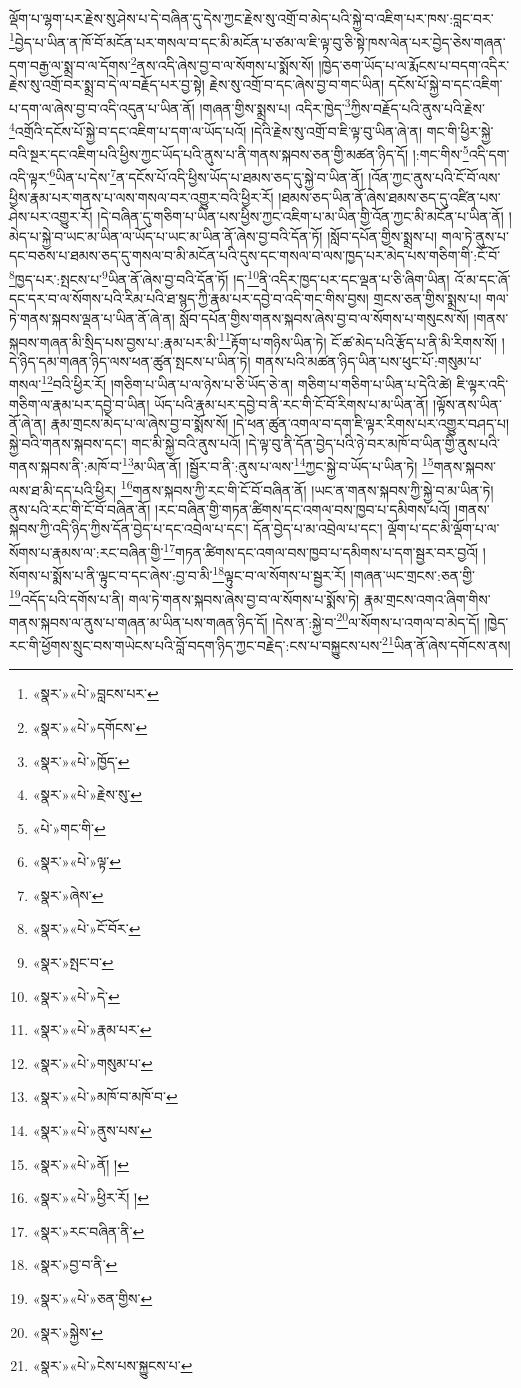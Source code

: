 ལྡོག་པ་ལྷག་པར་རྗེས་སུ་ཤེས་པ་དེ་བཞིན་དུ་དེས་ཀྱང་རྗེས་སུ་འགྲོ་བ་མེད་པའི་སྐྱེ་བ་འཇིག་པར་ཁས་:བླང་བར་\footnote{«སྣར་»«པེ་»བླངས་པར་}བྱེད་པ་ཡིན་ན་ཁོ་བོ་མངོན་པར་གསལ་བ་དང་མི་མངོན་པ་ཙམ་ལ་ཇི་ལྟ་བུ་ཅི་སྟེ་ཁས་ལེན་པར་བྱེད་ཅེས་གཞན་དག་བརྒྱ་ལ་སྨྲ་བ་ལ་དོགས་\footnote{«སྣར་»«པེ་»དགོངས་}ནས་འདི་ཞེས་བྱ་བ་ལ་སོགས་པ་སྨོས་སོ། །ཁྱེད་ཅག་ཡོད་པ་ལ་རྨོངས་པ་བདག་འདིར་རྗེས་སུ་འགྲོ་བར་སྨྲ་བ་དེ་ལ་བརྗོད་པར་བྱ་སྟེ། རྗེས་སུ་འགྲོ་བ་དང་ཞེས་བྱ་བ་གང་ཡིན། དངོས་པོ་སྐྱེ་བ་དང་འཇིག་པ་དག་ལ་ཞེས་བྱ་བ་འདི་འདུན་པ་ཡིན་ནོ། །གཞན་གྱིས་སྨྲས་པ། འདིར་ཁྱེད་\footnote{«སྣར་»«པེ་»ཁྱོད་}ཀྱིས་བརྗོད་པའི་ནུས་པའི་རྗེས་\footnote{«སྣར་»«པེ་»རྗེས་སུ་}འགྲོའི་དངོས་པོ་སྐྱེ་བ་དང་འཇིག་པ་དག་ལ་ཡོད་པའོ། །དེའི་རྗེས་སུ་འགྲོ་བ་ཇི་ལྟ་བུ་ཡིན་ཞེ་ན། གང་གི་ཕྱིར་སྐྱེ་བའི་སྔར་དང་འཇིག་པའི་ཕྱིས་ཀྱང་ཡོད་པའི་ནུས་པ་ནི་གནས་སྐབས་ཅན་གྱི་མཚན་ཉིད་དོ། །:གང་གིས་\footnote{«པེ་»གང་གི་}འདི་དག་འདི་ལྟར་\footnote{«སྣར་»«པེ་»ལྟ་}ཡིན་པ་དེས་\footnote{«སྣར་»ཞེས་}ན་དངོས་པོ་འདི་ཕྱིས་ཡོད་པ་ཐམས་ཅད་དུ་སྐྱེ་བ་ཡིན་ནོ། །འོན་ཀྱང་ནུས་པའི་ངོ་བོ་ལས་ཕྱིས་རྣམ་པར་གནས་པ་ལས་གསལ་བར་འགྱུར་བའི་ཕྱིར་རོ། །ཐམས་ཅད་ཡིན་ནོ་ཞེས་ཐམས་ཅད་དུ་འཛིན་པས་ཤེས་པར་འགྱུར་རོ། །དེ་བཞིན་དུ་གཅིག་པ་ཡིན་པས་ཕྱིས་ཀྱང་འཇིག་པ་མ་ཡིན་གྱི་འོན་ཀྱང་མི་མངོན་པ་ཡིན་ནོ། །མེད་པ་སྐྱེ་བ་ཡང་མ་ཡིན་ལ་ཡོད་པ་ཡང་མ་ཡིན་ནོ་ཞེས་བྱ་བའི་དོན་ཏོ། །སློབ་དཔོན་གྱིས་སྨྲས་པ། གལ་ཏེ་ནུས་པ་དང་བཅས་པ་ཐམས་ཅད་དུ་གསལ་བ་མི་མངོན་པའི་དུས་དང་གསལ་བ་ལས་ཁྱད་པར་མེད་པས་གཅིག་གི་:ངོ་བོ་\footnote{«སྣར་»«པེ་»ངོ་བོར་}ཁྱད་པར་:སྤངས་པ་\footnote{«སྣར་»སྤང་བ་}ཡིན་ནོ་ཞེས་བྱ་བའི་དོན་ཏོ། །ད་\footnote{«སྣར་»«པེ་»དེ་}ནི་འདིར་ཁྱད་པར་དང་ལྡན་པ་ཅི་ཞིག་ཡིན། འོ་མ་དང་ཞོ་དང་དར་བ་ལ་སོགས་པའི་རིམ་པའི་ཐ་སྙད་ཀྱི་རྣམ་པར་དབྱེ་བ་འདི་གང་གིས་བྱས། གྲངས་ཅན་གྱིས་སྨྲས་པ། གལ་ཏེ་གནས་སྐབས་ལྡན་པ་ཡིན་ནོ་ཞེ་ན། སློབ་དཔོན་གྱིས་གནས་སྐབས་ཞེས་བྱ་བ་ལ་སོགས་པ་གསུངས་སོ། །གནས་སྐབས་གཞན་མི་སྲིད་པས་བྱས་པ་:རྣམ་པར་མི་\footnote{«སྣར་»«པེ་»རྣམ་པར་}རྟོག་པ་གཉིས་ཡིན་ཏེ། ངོ་ཚ་མེད་པའི་རྩོད་པ་ནི་མི་རིགས་སོ། །དེ་ཉིད་དམ་གཞན་ཉིད་ལས་ཕན་ཚུན་སྤངས་པ་ཡིན་ཏེ། གནས་པའི་མཚན་ཉིད་ཡིན་པས་ཕུང་པོ་:གསུམ་པ་གསལ་\footnote{«སྣར་»«པེ་»གསུམ་པ་}བའི་ཕྱིར་རོ། །གཅིག་པ་ཡིན་པ་ལ་ཉེས་པ་ཅི་ཡོད་ཅེ་ན། གཅིག་པ་གཅིག་པ་ཡིན་པ་དེའི་ཚེ། ཇི་ལྟར་འདི་གཅིག་ལ་རྣམ་པར་དབྱེ་བ་ཡིན། ཡོད་པའི་རྣམ་པར་དབྱེ་བ་ནི་རང་གི་ངོ་བོ་རིགས་པ་མ་ཡིན་ནོ། །ལྟོས་ནས་ཡིན་ནོ་ཞེ་ན། རྣམ་གྲངས་མེད་པ་ལ་ཞེས་བྱ་བ་སྨོས་སོ། །དེ་ཕན་ཚུན་འགལ་བ་དག་ཇི་ལྟར་རིགས་པར་འགྱུར་བཤད་པ། སྐྱེ་བའི་གནས་སྐབས་དང་། གང་མི་སྐྱེ་བའི་ནུས་པའོ། །དེ་ལྟ་བུ་ནི་དོན་བྱེད་པའི་ཉེ་བར་མཁོ་བ་ཡིན་གྱི་ནུས་པའི་གནས་སྐབས་ནི་:མཁོ་བ་\footnote{«སྣར་»«པེ་»མཁོ་བ་མཁོ་བ་}མ་ཡིན་ནོ། །སྦྱོར་བ་ནི་:ནུས་པ་ལས་\footnote{«སྣར་»«པེ་»ནུས་པས་}ཀྱང་སྐྱེ་བ་ཡོད་པ་ཡིན་ཏེ། \footnote{«སྣར་»«པེ་»ནོ། ། }གནས་སྐབས་ལས་ཐ་མི་དད་པའི་ཕྱིར། \footnote{«སྣར་»«པེ་»ཕྱིར་རོ། ། }གནས་སྐབས་ཀྱི་རང་གི་ངོ་བོ་བཞིན་ནོ། །ཡང་ན་གནས་སྐབས་ཀྱི་སྐྱེ་བ་མ་ཡིན་ཏེ། ནུས་པའི་རང་གི་ངོ་བོ་བཞིན་ནོ། །རང་བཞིན་གྱི་གཏན་ཚིགས་དང་འགལ་བས་ཁྱབ་པ་དམིགས་པའོ། །གནས་སྐབས་ཀྱི་འདི་ཉིད་ཀྱིས་དོན་བྱེད་པ་དང་འབྲེལ་པ་དང་། དོན་བྱེད་པ་མ་འབྲེལ་པ་དང་། ལྡོག་པ་དང་མི་ལྡོག་པ་ལ་སོགས་པ་རྣམས་ལ་:རང་བཞིན་གྱི་\footnote{«སྣར་»རང་བཞིན་ནི་}གཏན་ཚིགས་དང་འགལ་བས་ཁྱབ་པ་དམིགས་པ་དག་སྦྱར་བར་བྱའོ། །སོགས་པ་སྨོས་པ་ནི་ལྟུང་བ་དང་ཞེས་:བྱ་བ་མི་\footnote{«སྣར་»བྱ་བ་ནི་}ལྟུང་བ་ལ་སོགས་པ་སྦྱར་རོ། །གཞན་ཡང་གྲངས་:ཅན་གྱི་\footnote{«སྣར་»«པེ་»ཅན་གྱིས་}འདོད་པའི་དགོས་པ་ནི། གལ་ཏེ་གནས་སྐབས་ཞེས་བྱ་བ་ལ་སོགས་པ་སྨོས་ཏེ། རྣམ་གྲངས་འགའ་ཞིག་གིས་གནས་སྐབས་ལ་ནུས་པ་གཞན་མ་ཡིན་པས་གཞན་ཉིད་དོ། །དེས་ན་:སྐྱེ་བ་\footnote{«སྣར་»སྐྱེས་}ལ་སོགས་པ་འགལ་བ་མེད་དོ། །ཁྱེད་རང་གི་ཕྱོགས་སྲུང་བས་གཡེངས་པའི་བློ་བདག་ཉིད་ཀྱང་བརྗེད་:ངས་པ་བསྐྱུངས་པས་\footnote{«སྣར་»«པེ་»ངེས་པས་སྐྱུངས་པ་}ཡིན་ནོ་ཞེས་དགོངས་ནས། 